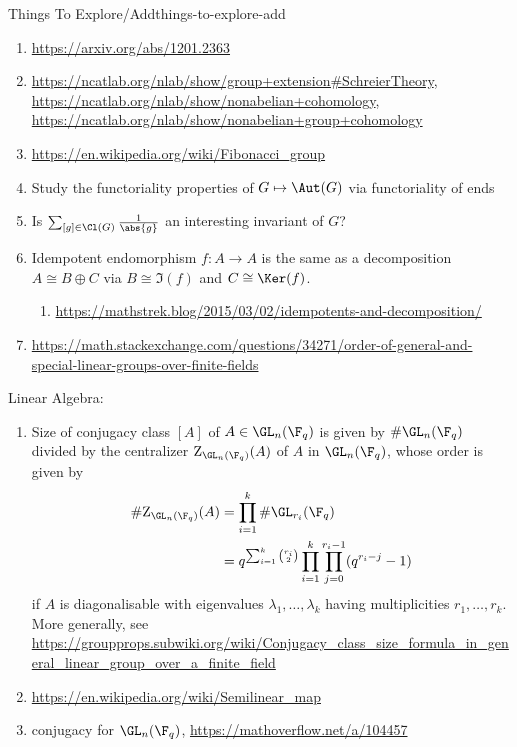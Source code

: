 \begin{remark}{Things To Explore/Add}{things-to-explore-add}
\begin{enumerate}
        \item \url{https://arxiv.org/abs/1201.2363}
        \item \url{https://ncatlab.org/nlab/show/group+extension#SchreierTheory}, \url{https://ncatlab.org/nlab/show/nonabelian+cohomology}, \url{https://ncatlab.org/nlab/show/nonabelian+group+cohomology}
        \item \url{https://en.wikipedia.org/wiki/Fibonacci_group}
        \item Study the functoriality properties of $G\mapsto\Aut(G)$ via functoriality of ends
        \item Is $\sum_{[g]\in\Cl(G)}\frac{1}{\abs{g}}$ an interesting invariant of $G$?
        \item Idempotent endomorphism $f\colon A\to A$ is the same as a decomposition $A\cong B\oplus C$ via $B\cong\Im(f)$ and $C\cong\Ker(f)$.
            \begin{enumerate}
                \item \url{https://mathstrek.blog/2015/03/02/idempotents-and-decomposition/}
            \end{enumerate}
        \item \url{https://math.stackexchange.com/questions/34271/order-of-general-and-special-linear-groups-over-finite-fields}
    \end{enumerate}
    Linear Algebra:
    \begin{enumerate}
        \item Size of conjugacy class $[A]$ of $A\in\GL_{n}(\F_{q})$ is given by $\#\GL_{n}(\F_{q})$ divided by the centralizer $\mathrm{Z}_{\GL_{n}(\F_{q})}(A)$ of $A$ in $\GL_{n}(\F_{q})$, whose order is given by
            \begin{align*}
                \#\mathrm{Z}_{\GL_{n}(\F_{q})}(A) &= \prod^{k}_{i=1}\#\GL_{r_{i}}(\F_{q})\\%
                                                  &= q^{\sum^{k}_{i=1}\binom{r_{i}}{2}}\prod^{k}_{i=1}\prod^{r_{i}-1}_{j=0}(q^{r_{i}-j}-1)%
            \end{align*}
            if $A$ is diagonalisable with eigenvalues $\lambda_{1},\ldots,\lambda_{k}$ having multiplicities $r_{1},\ldots,r_{k}$. More generally, see \url{https://groupprops.subwiki.org/wiki/Conjugacy_class_size_formula_in_general_linear_group_over_a_finite_field}
        \item \url{https://en.wikipedia.org/wiki/Semilinear\_map}
        \item conjugacy for $\GL_{n}(\F_{q})$, \url{https://mathoverflow.net/a/104457}

\end{enumerate}
\end{remark}
